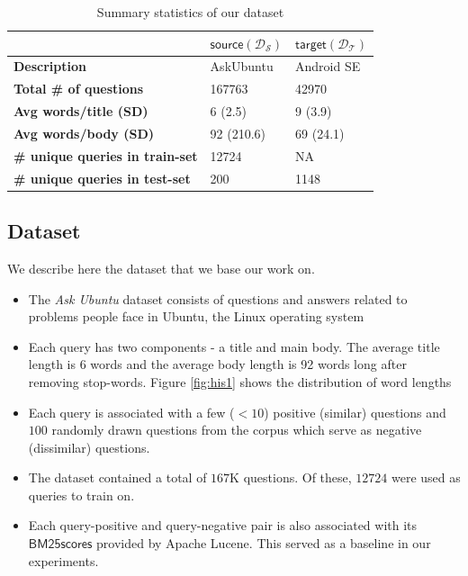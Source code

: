 \documentclass{sigkddExp}
\begin{document}
\begin{table}[h]
\begin{tabular}{l|l|l}
     
     & $\mathsf{source} (\mathcal{D_S})$
     & $\mathsf{target} (\mathcal{D_T})$
     \\
     \toprule
     \textbf{Description}
     & \textsf{AskUbuntu}
     & \textsf{Android SE}
     \\
     \textbf{Total \# of questions}
     & 167763
     & 42970
     \\
     \textbf{Avg words/title (SD)}
     & 6 (2.5)
     & 9 (3.9)
     \\
     \textbf{Avg words/body (SD)}
     & 92 (210.6)
     & 69 (24.1)
     \\
     \textbf{\# unique queries in train-set}
     & 12724
     & NA
     \\
     \textbf{\# unique queries in test-set}
     & 200
     & 1148
     
\end{tabular}
\caption{Summary statistics of our dataset}
\label{tab:dataset}
\end{table}

\subsection{Dataset}
We describe here the dataset that we base our work on.
\begin{itemize}[topsep=0pt,itemsep=-1ex,partopsep=1ex,parsep=1ex]
\item The \textit{Ask Ubuntu} dataset consists of questions and answers related to problems people face in Ubuntu, the Linux operating system
\item Each query has two components - a title and main body. The average title length is 6 words and the average body length is 92 words long after removing stop-words. Figure \ref{fig:his1} shows the distribution of word lengths
\item Each query is associated with a few ($<10$) positive (similar) questions and $100$ randomly drawn questions from the corpus which serve as negative (dissimilar) questions.
\item The dataset contained a total of $167$K questions. Of these, $12724$ were used as queries to train on.
\item Each query-positive and query-negative pair is also associated with its $\mathsf{BM25 scores}$ provided by Apache Lucene. This served as a baseline in our experiments.
\end{itemize}
\end{document}
